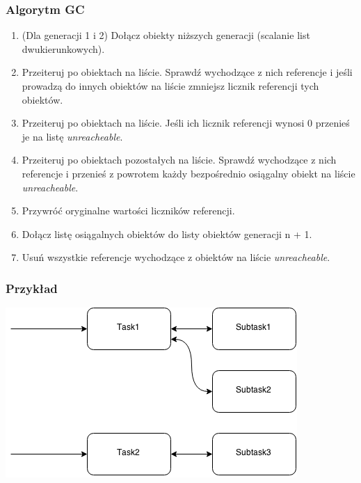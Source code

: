 \documentclass{beamer}
\begin{document}
    \begin{frame}
        \frametitle{Algorytm GC}
        \begin{enumerate}
            \item (Dla generacji 1 i 2) Dołącz obiekty niższych generacji (scalanie list dwukierunkowych).
            \item Przeiteruj po obiektach na liście. Sprawdź wychodzące z nich referencje i jeśli prowadzą do innych obiektów na liście zmniejsz licznik referencji tych obiektów.
            \item Przeiteruj po obiektach na liście. Jeśli ich licznik referencji wynosi 0 przenieś je na listę \textit{unreacheable}.
            \item Przeiteruj po obiektach pozostałych na liście. Sprawdź wychodzące z nich referencje i przenieś z powrotem każdy bezpośrednio osiągalny obiekt na liście \textit{unreacheable}.
            \item Przywróć oryginalne wartości liczników referencji.
            \item Dołącz listę osiągalnych obiektów do listy obiektów generacji n + 1.
            \item Usuń wszystkie referencje wychodzące z obiektów na liście \textit{unreacheable}.
        \end{enumerate}
    \end{frame}

    \begin{frame}
        \frametitle{Przykład}
        \begin{center}
            \includegraphics[height=0.5\textheight]{graph_initial.png}
        \end{center}
    \end{frame}
\end{document}
